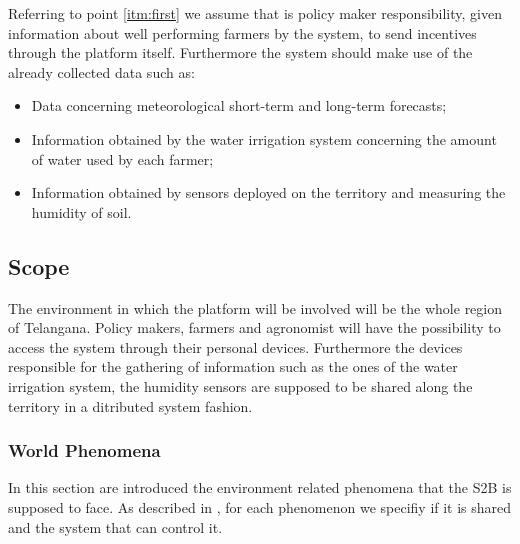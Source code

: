 Referring to point \ref{itm:first} we assume that is policy maker responsibility, given information about well performing farmers by the system, to send incentives through the platform itself.
Furthermore the system should make use of the already collected data such as:
\begin{itemize}
    \item Data concerning meteorological short-term and long-term forecasts;
    \item Information obtained by the water irrigation system concerning the amount of water used by each farmer;
    \item Information obtained by sensors deployed on the territory and measuring the humidity of soil.
\end{itemize}


\subsection{Scope}
\label{sec:scope}
The environment in which the platform will be involved will be the whole region of Telangana. Policy makers, farmers and agronomist will have the possibility to access the system through their personal devices. Furthermore the devices responsible for the gathering of information such as the ones of the water irrigation system, the humidity sensors are supposed to be shared along the territory in a ditributed system fashion.
\newpage
\subsubsection{World Phenomena}
In this section are introduced the environment related phenomena that the S2B is supposed to face. As described in \cite{jackson_twatm}, for each phenomenon we specifiy if it is shared and the system that can control it.


